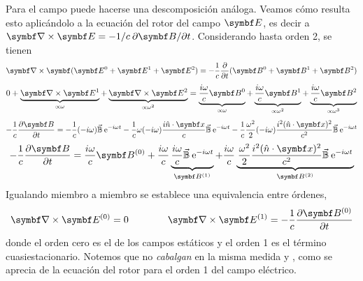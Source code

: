 \documentclass[10pt,oneside]{CBFT_book}
\begin{document}
Para el campo  puede hacerse una descomposición análoga. 
Veamos cómo resulta esto aplicándolo a la ecuación del rotor del campo $\vb{E}$, es decir a
$\rotorm{E} = -1/c \: \partial{\vb{B}}/\partial t$.
Considerando hasta orden 2, se tienen
\[
	\rotorm{}(\vb{E}^0 + \vb{E}^1 + \vb{E}^2) = -\frac{1}{c} \dpar{}{t}(\vb{B}^0 + \vb{B}^1 + \vb{B}^2)
\]
\[
	0 + \underbrace{\rotorm{E}^1}_{\propto \omega } + \underbrace{\rotorm{E}^2}_{\propto \omega^2 } = 
	\underbrace{\frac{i\omega}{c}\vb{B}^0}_{\propto \omega } + \underbrace{\frac{i\omega}{c}
	\vb{B}^1}_{\propto \omega^2 } + \underbrace{\frac{i\omega}{c}\vb{B}^2}_{\propto \omega^3 }
\]
\[
	-\frac{1}{c}\dpar{\vb{B}}{t} = -\frac{1}{c}(-i\omega)\vec{\mathbb{B}}\euler^{-i\omega t}
	-\frac{1}{c}\omega(-i\omega)\frac{i\hat{n}\cdot\vb{x}}{c}\vec{\mathbb{B}}\euler^{-i\omega t}
	-\frac{1}{c}\frac{\omega^2}{2}(-i\omega)\frac{i^2(\hat{n}\cdot\vb{x})^2}{c^2}\vec{\mathbb{B}}\euler^{-i\omega t}
\]
\[
	-\frac{1}{c}\dpar{\vb{B}}{t} = \frac{i\omega}{c}\vb{B}^{(0)} 
	+ \frac{i\omega}{c} \underbrace{\frac{i\omega}{c}\vec{\mathbb{B}}\euler^{-i\omega t}}_{\vb{B}^{(1)}}
	+ \frac{i\omega}{c} \underbrace{ \left.\frac{\omega^2}{2}\frac{i^2(\hat{n}\cdot\vb{x})^2}	
	{c^2}\vec{\mathbb{B}} \euler^{-i\omega t}\right.}_{\vb{B}^{(2)}}
\]
Igualando miembro a miembro se establece una equivalencia entre órdenes,
\[
	\rotorm{E}^{(0)} = 0 \qquad \qquad \rotorm{E}^{(1)} = -\frac{1}{c}\dpar{\vb{B}^{(0)}}{t}
\]
donde el orden cero es el de los campos estáticos y el orden 1 es el término
cuasiestacionario. Notemos que no {\it cabalgan} en la misma medida  y ,
como se aprecia de la ecuación del rotor para el orden 1 del campo eléctrico.
\end{document}
